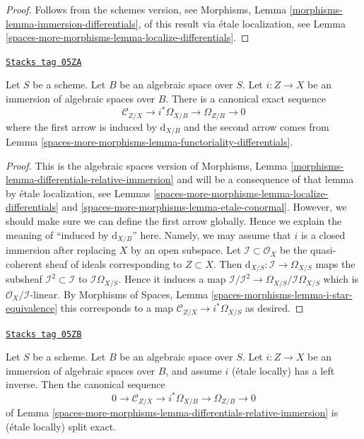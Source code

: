 \begin{proof}
Follows from the schemes version, see
Morphisms, Lemma \ref{morphisms-lemma-immersion-differentials},
of this result via \'etale localization, see
Lemma \ref{spaces-more-morphisms-lemma-localize-differentials}.
\end{proof}

\begin{lemma}
\label{spaces-more-morphisms-lemma-differentials-relative-immersion}
\href{https://stacks.math.columbia.edu/tag/05ZA}{\texttt{Stacks tag 05ZA}}

Let $S$ be a scheme. Let $B$ be an algebraic space over $S$.
Let $i : Z \to X$ be an immersion of algebraic spaces over $B$.
There is a canonical exact sequence
$$
\mathcal{C}_{Z/X} \to i^*\Omega_{X/B} \to \Omega_{Z/B} \to 0
$$
where the first arrow is induced by $\text{d}_{X/B}$
and the second arrow comes from
Lemma \ref{spaces-more-morphisms-lemma-functoriality-differentials}.
\end{lemma}

\begin{proof}
This is the algebraic spaces version of
Morphisms, Lemma \ref{morphisms-lemma-differentials-relative-immersion}
and will be a consequence of that lemma by
\'etale localization, see
Lemmas \ref{spaces-more-morphisms-lemma-localize-differentials} and
\ref{spaces-more-morphisms-lemma-etale-conormal}.
However, we should make sure we can define the first arrow globally.
Hence we explain the meaning of ``induced by $\text{d}_{X/B}$'' here.
Namely, we may assume that $i$ is a closed immersion after replacing $X$
by an open subspace. Let $\mathcal{I} \subset \mathcal{O}_X$
be the quasi-coherent sheaf of ideals corresponding to $Z \subset X$.
Then $\text{d}_{X/S} : \mathcal{I} \to \Omega_{X/S}$
maps the subsheaf $\mathcal{I}^2 \subset \mathcal{I}$ to
$\mathcal{I}\Omega_{X/S}$. Hence it induces a map
$\mathcal{I}/\mathcal{I}^2 \to \Omega_{X/S}/\mathcal{I}\Omega_{X/S}$
which is $\mathcal{O}_X/\mathcal{I}$-linear.
By
Morphisms of Spaces, Lemma \ref{spaces-morphisms-lemma-i-star-equivalence}
this corresponds to a map $\mathcal{C}_{Z/X} \to i^*\Omega_{X/S}$ as desired.
\end{proof}

\begin{lemma}
\label{spaces-more-morphisms-lemma-differentials-relative-immersion-section}
\href{https://stacks.math.columbia.edu/tag/05ZB}{\texttt{Stacks tag 05ZB}}

Let $S$ be a scheme. Let $B$ be an algebraic space over $S$.
Let $i : Z \to X$ be an immersion of algebraic spaces over $B$, and
assume $i$ (\'etale locally) has a left inverse. Then the canonical
sequence
$$
0 \to \mathcal{C}_{Z/X} \to i^*\Omega_{X/B} \to \Omega_{Z/B} \to 0
$$
of
Lemma \ref{spaces-more-morphisms-lemma-differentials-relative-immersion}
is (\'etale locally) split exact.
\end{lemma}

